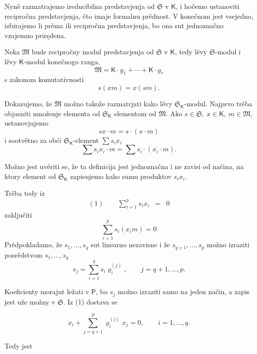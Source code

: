 \documentclass[11pt]{article}
\begin{document}
Nyně razmatrajemo ireducibilna predstavjenja od \(\mathfrak S\) v \(\mathsf K\), i hočemo ustanoviti recipročna predstavjenja, čto imaje formalnu prědnost. V konečnom jest vsejedno, izbirajemo li prěma ili recipročna predstavjenja, bo ona sut jednoznačno vzajemno priręđena.

Neka \(\mathfrak M\) bude recipročny modul predstavjenja od \(\mathfrak S\) v \(\mathsf K\), tedy lěvy \(\mathfrak S\)-modul i lěvy \(\mathsf K\)-modul konečnogo ranga,
\[
\mathfrak M=\mathsf K\cdot y_1+\cdots+\mathsf K\cdot y_r
\]
s zakonom komutativnosti
\[
s(xm)=x(sm).
\]

Dokazujemo, že \(\mathfrak M\) možno takože razmatrjati kako lěvy \(\mathfrak S_{\mathsf K}\)-modul. Najprvo trěba objasniti množenje elementa od \(\mathfrak S_{\mathsf K}\) elementom od \(\mathfrak M\). Ako \(s\in\mathfrak S,\ x\in\mathsf K,\ m\in\mathfrak M\), ustanovjujemo
\[
sx\cdot m=s\cdot(x\cdot m)
\]
i sootvětno za obći \(\mathfrak S_{\mathsf K}\)-element \(\sum s_ix_i\)
\[
\sum s_ix_i\cdot m=\sum s_i\cdot(x_i\cdot m).
\]

Možno jest uvěriti se, že ta definicija jest jednoznačna i ne zavisi od načina, na ktory element od \(\mathfrak S_{\mathsf K}\) zapisujemo kako sumu produktov \(s_ix_i\).

Trěba tedy iz
\[
\begin{array}{rcl}
(1)\qquad \displaystyle\sum_{i=1}^{p}s_ix_i&=&0
\end{array}
\]
zaključiti
\[
\sum_{i=1}^{p}s_i(x_i m)=0
\]
Prědpokladamo, že \(s_1,\ldots,s_q\) sut linearno nezavisne i že \(s_{q+1},\ldots,s_p\) možno izraziti posrědstvom \(s_1,\ldots,s_q\)
\[
s_j=\sum_{i=1}^{q}s_i\varrho_i^{(j)},\qquad j=q+1,\ldots,p.
\]

Koeficienty morajut ležati v \(\mathsf P\), bo \(s_j\) možno izraziti samo na jeden način, a zapis jest uže možny v \(\mathfrak S\). Iz (1) dostava se

\[
x_i+\sum_{j=q+1}^{p}\varrho_i^{(j)}x_j=0,\qquad i=1,\ldots,q.
\]

Tedy jest
\end{document}

